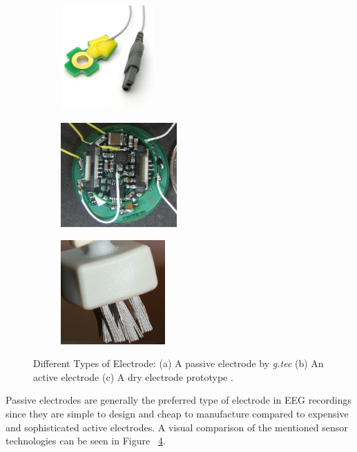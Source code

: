 \documentclass[12pt]{article}
\numberwithin{equation}{section}
\numberwithin{figure}{section}
\numberwithin{table}{section}
\begin{document}
\par {
    \begin{figure}
        \centering
        \begin{subfigure}{.33\textwidth}
            \centering
            \includegraphics[height=4cm]{images/gtec_passive}
            \caption{}
            \label{fig:electrode_gtec}
        \end{subfigure}%
        \begin{subfigure}{.33\textwidth}
            \centering
            \includegraphics[height=4cm]{images/active_electrode}
            \caption{}
            \label{fig:electrode_active}
        \end{subfigure}%
        \begin{subfigure}{.33\textwidth}
            \centering
            \includegraphics[height=4cm]{images/bristle_dry}
            \caption{}
            \label{fig:electrode_dry}
        \end{subfigure}
        \caption[Different Types of Electrode]{Different Types of Electrode: (a) A passive electrode by \emph{g.tec} (b) An active electrode \citep{sullivan_low-noise_2007} (c) A dry electrode prototype \citep{grozea_bristle-sensorslow-cost_2011}.}
        \label{fig:diff_types_electrode}
    \end{figure}

    Passive electrodes are generally the preferred type of electrode in EEG recordings
    since they are simple to design and cheap to manufacture \citep{wolpaw_brain-computer_2012}
    compared to expensive and sophisticated active electrodes. A visual comparison
    of the mentioned sensor technologies can be seen in Figure ~\ref{fig:diff_types_electrode}.
}
\end{document}
